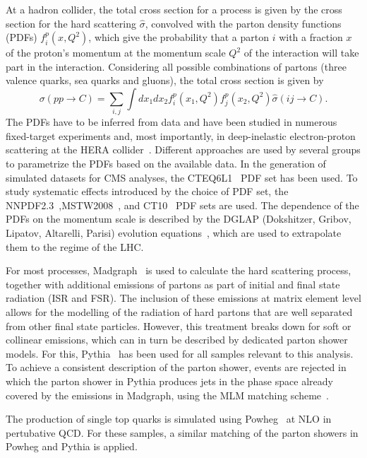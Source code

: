 At a hadron collider, the total cross section for a process is given by the cross section for the hard scattering $\hat{\sigma}$, convolved with the parton density functions (PDFs) $f^p_i(x,Q^2)$, which give the probability that a parton $i$ with a fraction $x$ of the proton's momentum at the momentum scale $Q^2$ of the interaction will take part in the interaction. Considering all possible combinations of partons (three valence quarks, sea quarks and gluons), the total cross section is given by
\begin{equation}
\sigma (pp \rightarrow C)  = \sum\limits_{i,j} \int dx_1 dx_2 f^p_i (x_1,Q^2) f^p_j(x_2,Q^2) \hat{\sigma}(ij\rightarrow C).
\end{equation} 
The PDFs have to be inferred from data and have been studied in numerous fixed-target experiments and, most importantly, in deep-inelastic electron-proton scattering at the HERA collider~\cite{Aaron:2009aa}. Different approaches are used by several groups to parametrize the PDFs based on the available data. In the generation of simulated datasets for CMS analyses, the CTEQ6L1~\cite{Pumplin:2002vw} PDF set has been used. To study systematic effects introduced by the choice of PDF set, the NNPDF2.3~\cite{Ball:2012cx},MSTW2008~\cite{Martin:2009iq}, and CT10~\cite{Lai:2010vv} PDF sets are used. The dependence of the PDFs on the momentum scale is described by the DGLAP (Dokshitzer, Gribov, Lipatov, Altarelli, Parisi) evolution equations~\cite{Gribov,Altarelli:1977zs,Dokshitzer}, which are used to extrapolate them to the regime of the LHC. 

For most processes, Madgraph~\cite{Madgraph1,Madgraph2} is used to calculate the hard scattering process, together with additional emissions of partons as part of initial and final state radiation (ISR and FSR). The inclusion of these emissions at matrix element level allows for the modelling of the radiation of hard partons that are well separated from other final state particles. However, this treatment breaks down for soft or collinear emissions, which can in turn be described by dedicated parton shower models. For this, Pythia~\cite{Pythia} has been used for all samples relevant to this analysis. To achieve a consistent description of the parton shower, events are rejected in which the parton shower in Pythia produces jets in the phase space already covered by the emissions in Madgraph, using the MLM matching scheme~\cite{Hoche:2006ph}. 

The production of single top quarks is simulated using Powheg~\cite{Powheg,Alioli:2009je,Re:2010bp} at NLO in pertubative QCD. For these samples, a similar matching of the parton showers in Powheg and Pythia is applied.  

